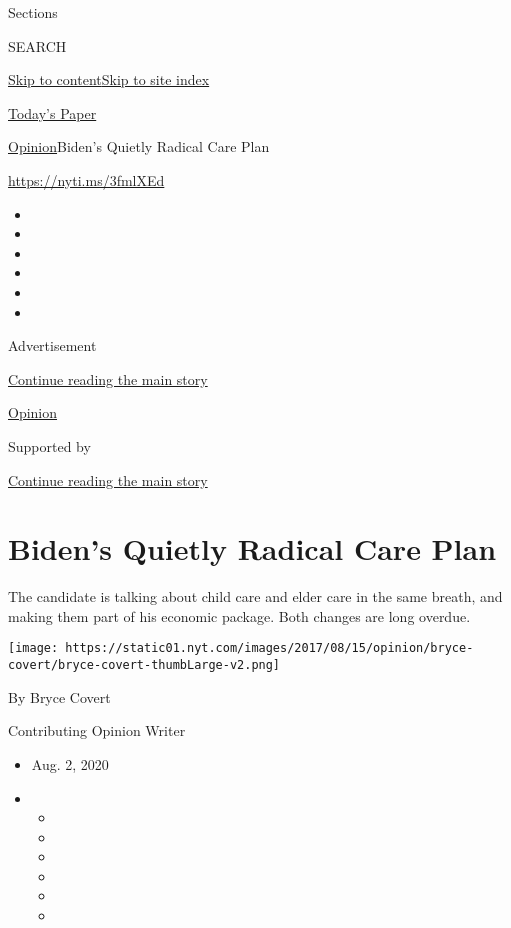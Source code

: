 Sections

SEARCH

\protect\hyperlink{site-content}{Skip to
content}\protect\hyperlink{site-index}{Skip to site index}

\href{https://myaccount.nytimes.com/auth/login?response_type=cookie\&client_id=vi}{}

\href{https://www.nytimes.com/section/todayspaper}{Today's Paper}

\href{/section/opinion}{Opinion}\textbar{}Biden's Quietly Radical Care
Plan

\url{https://nyti.ms/3fmlXEd}

\begin{itemize}
\item
\item
\item
\item
\item
\item
\end{itemize}

Advertisement

\protect\hyperlink{after-top}{Continue reading the main story}

\href{/section/opinion}{Opinion}

Supported by

\protect\hyperlink{after-sponsor}{Continue reading the main story}

\hypertarget{bidens-quietly-radical-care-plan}{%
\section{Biden's Quietly Radical Care
Plan}\label{bidens-quietly-radical-care-plan}}

The candidate is talking about child care and elder care in the same
breath, and making them part of his economic package. Both changes are
long overdue.

\texttt{[image: https://static01.nyt.com/images/2017/08/15/opinion/bryce-covert/bryce-covert-thumbLarge-v2.png]}

By Bryce Covert

Contributing Opinion Writer

\begin{itemize}
\item
  Aug. 2, 2020
\item
  \begin{itemize}
  \item
  \item
  \item
  \item
  \item
  \item
  \end{itemize}
\end{itemize}

